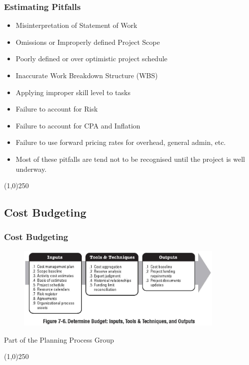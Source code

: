 \begin{frame}
\frametitle{Estimating Pitfalls}
\begin{itemize}
	\item Misinterpretation of Statement of Work
	\item Omissions or Improperly defined Project Scope
	\item Poorly defined or over optimistic project schedule
	\item Inaccurate Work Breakdown Structure (WBS)
	\item Applying improper skill level to tasks
	\item Failure to account for Risk
	\item Failure to account for CPA and Inflation
	\item Failure to use forward pricing rates for overhead, general admin, etc.
	\item Most of these pitfalls are tend not to be recognised until the project is well underway.
\end{itemize}
\end{frame}
\begin{center}\line(1,0){250}\end{center}







\subsection{Cost Budgeting}

\begin{frame}
\frametitle{Cost Budgeting}
\begin{figure}
	\centering
		\includegraphics[width = 10cm]{images/fig7-6.jpg}
	\label{fig:7-6}
\end{figure}Part of the Planning Process Group
\end{frame}
\begin{center}\line(1,0){250}\end{center}






